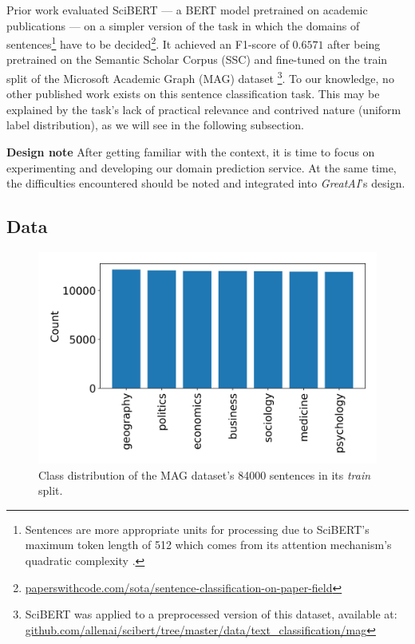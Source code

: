 Prior work evaluated SciBERT \cite{beltagy2019scibert} --- a BERT \cite{devlin2018bert} model pretrained on academic publications --- on a simpler version of the task in which the domains of sentences\footnote{Sentences are more appropriate units for processing due to SciBERT's maximum token length of 512 which comes from its attention mechanism's quadratic complexity \cite{vaswani2017attention}.} have to be decided\footnote{\href{https://paperswithcode.com/sota/sentence-classification-on-paper-field}{paperswithcode.com/sota/sentence-classification-on-paper-field}}. It achieved an F1-score of $0.6571$ after being pretrained on the Semantic Scholar Corpus (SSC) \cite{Lo2020S2ORCTS} and fine-tuned on the train split of the Microsoft Academic Graph (MAG) dataset \cite{wang2019review}\footnote{SciBERT was applied to a preprocessed version of this dataset, available at: \\ \href{https://github.com/allenai/scibert/tree/master/data/text_classification/mag}{github.com/allenai/scibert/tree/master/data/text\_classification/mag}}. To our knowledge, no other published work exists on this sentence classification task. This may be explained by the task's lack of practical relevance and contrived nature (uniform label distribution), as we will see in the following subsection.

\begin{displayquote}
\textbf{Design note} After getting familiar with the context, it is time to focus on experimenting and developing our domain prediction service. At the same time, the difficulties encountered should be noted and integrated into \textit{GreatAI}'s design.
\end{displayquote}

\subsection{Data}

\begin{figure}
    \centering
    \includegraphics[width=0.45\linewidth]{figures/mag-distribution.png}
    \captionsetup{width=.9\linewidth}
    \caption{Class distribution of the MAG  \cite{wang2019review} dataset's 84000 sentences in its \textit{train} split.}
    \label{fig:mag-distribtion}
\end{figure}

